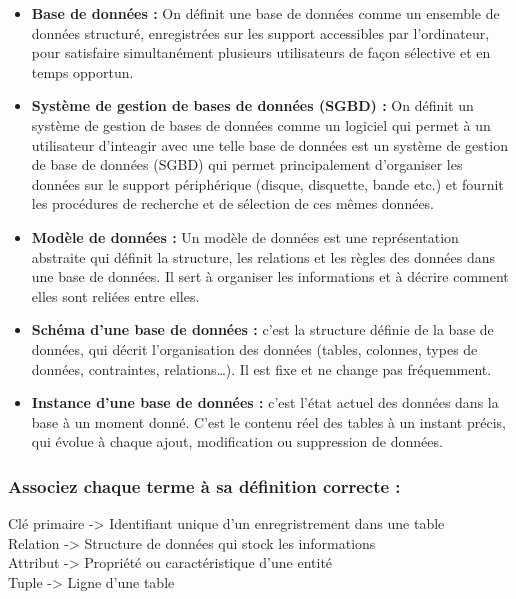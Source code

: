 \documentclass{article}
\begin{document}
\begin{itemize}

  \item \textbf{Base de données :} On définit une base de données comme un ensemble de données structuré, enregistrées
sur les support accessibles par l’ordinateur, pour satisfaire simultanément plusieurs utilisateurs de façon sélective et en temps opportun.

\item \textbf{Système de gestion de bases de données (SGBD) :} On définit un système de gestion de bases de données comme un logiciel qui permet à un utilisateur d’inteagir avec une telle base de données est un système de gestion de base de données (SGBD) qui permet principalement d’organiser les données sur le support périphérique (disque, disquette, bande etc.) et fournit les procédures de recherche et de sélection de ces mêmes données. 

\item \textbf{Modèle de données :} Un modèle de données est une représentation abstraite qui définit la structure, les relations et les règles des données dans une base de données. Il sert à organiser les informations et à décrire comment elles sont reliées entre elles.

\item \textbf{Schéma d’une base de données :} c’est la structure définie de la base de données, qui décrit l’organisation des données (tables, colonnes, types de données, contraintes, relations…). Il est fixe et ne change pas fréquemment.

\item \textbf{Instance d’une base de données :} c’est l’état actuel des données dans la base à un moment donné. C’est le contenu réel des tables à un instant précis, qui évolue à chaque ajout, modification ou suppression de données.
\end{itemize}


\subsubsection{Associez chaque terme à sa définition correcte :}

Clé primaire -> Identifiant unique d'un enregristrement dans une table \\
Relation     -> Structure de données qui stock les informations \\
Attribut     -> Propriété ou caractéristique d'une entité \\
Tuple        -> Ligne d'une table \\
\end{document}
